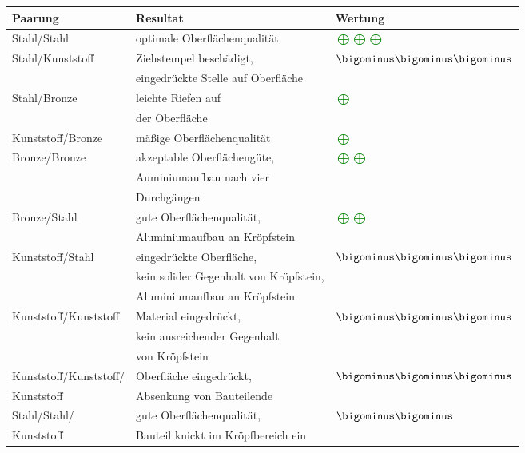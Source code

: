 \documentclass[12pt,a4paper,parskip,twoside,BCOR5mm,headsepline]{scrartcl}
\begin{document}
\begin{description*}
\begin{table}[hbtp]
\label{tab:kropfversuche}
\centering
\begin{tabular}{lll}
\toprule
Paarung &  Resultat &  Wertung  \\
\midrule
Stahl/Stahl&optimale Oberflächenqualität&\textcolor{green}{$\bigoplus \bigoplus \bigoplus$}\\
Stahl/Kunststoff&Ziehstempel beschädigt,&\textcolor{red}{$\bigominus\bigominus\bigominus$}\\
&eingedrückte Stelle auf Oberfläche&\\
Stahl/Bronze&leichte Riefen auf&\textcolor{green}{$\bigoplus $} \\
&der Oberfläche&\\
Kunststoff/Bronze& mäßige Oberflächenqualität & \textcolor{green}{$\bigoplus$}\\
Bronze/Bronze&akzeptable Oberflächengüte,&\textcolor{green}{$\bigoplus\bigoplus$}\\
&Auminiumaufbau nach vier&\\
&Durchgängen&\\
Bronze/Stahl&gute Oberflächenqualität,&\textcolor{green}{$\bigoplus\bigoplus$}\\
&Aluminiumaufbau an Kröpfstein&\\
Kunststoff/Stahl&eingedrückte Oberfläche,&\textcolor{red}{$\bigominus\bigominus\bigominus$}\\
&kein solider Gegenhalt von Kröpfstein,&\\
&Aluminiumaufbau an Kröpfstein&\\
Kunststoff/Kunststoff&Material eingedrückt,&\textcolor{red}{$\bigominus\bigominus\bigominus$}\\
&kein ausreichender Gegenhalt&\\
&von Kröpfstein&\\
Kunststoff/Kunststoff/&Oberfläche eingedrückt,&\textcolor{red}{$\bigominus\bigominus\bigominus$}\\
Kunststoff&Absenkung von Bauteilende&\\
Stahl/Stahl/&gute Oberflächenqualität,&\textcolor{red}{$\bigominus\bigominus$}\\
Kunststoff&Bauteil knickt im Kröpfbereich ein&\\


\bottomrule
\end{tabular}
\end{table}











\end{description*}
\end{document}

